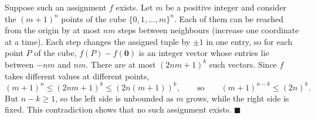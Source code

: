 Suppose such an assignment $f$ exists. Let $m$ be a positive integer and consider the $(m+1)^n$ points of the cube $\{0,1,\dots,m\}^n$. Each of them can be reached from the origin by at most $nm$ steps between neighbours (increase one coordinate at a time). Each step changes the assigned tuple by $\pm1$ in one entry, so for each point $P$ of the cube, $f(P)-f(\mathbf 0)$ is an integer vector whose entries lie between $-nm$ and $nm$. There are at most $(2nm+1)^k$ such vectors. Since $f$ takes different values at different points,
\[(m+1)^n\le(2nm+1)^k\le\left(2n(m+1)\right)^k,\qquad\text{so}\qquad(m+1)^{n-k}\le(2n)^k.\]
But $n-k\ge1$, so the left side is unbounded as $m$ grows, while the right side is fixed. This contradiction shows that no such assignment exists. $\blacksquare$
